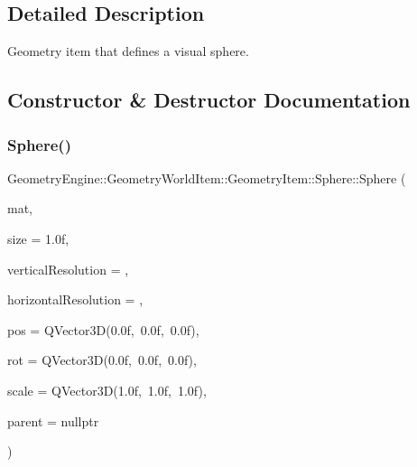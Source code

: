\subsection{Detailed Description}
Geometry item that defines a visual sphere. 

\subsection{Constructor \& Destructor Documentation}
\mbox{\label{class_geometry_engine_1_1_geometry_world_item_1_1_geometry_item_1_1_sphere_a347e98690182023f565422548d4a6b9f}} 
\subsubsection{\texorpdfstring{Sphere()}{Sphere()}\hspace{0.1cm}{\footnotesize\ttfamily [1/2]}}
{\footnotesize\ttfamily Geometry\+Engine\+::\+Geometry\+World\+Item\+::\+Geometry\+Item\+::\+Sphere\+::\+Sphere (\begin{DoxyParamCaption}\item[{const \mbox{\hyperlink{class_geometry_engine_1_1_geometry_material_1_1_material}{Geometry\+Material\+::\+Material}} \&}]{mat,  }\item[{float}]{size = {\ttfamily 1.0f},  }\item[{int}]{vertical\+Resolution = {},  }\item[{int}]{horizontal\+Resolution = {},  }\item[{const Q\+Vector3D \&}]{pos = {\ttfamily QVector3D(0.0f,~0.0f,~0.0f)},  }\item[{const Q\+Vector3D \&}]{rot = {\ttfamily QVector3D(0.0f,~0.0f,~0.0f)},  }\item[{const Q\+Vector3D \&}]{scale = {\ttfamily QVector3D(1.0f,~1.0f,~1.0f)},  }\item[{\mbox{\hyperlink{class_geometry_engine_1_1_geometry_world_item_1_1_world_item}{World\+Item}} $\ast$}]{parent = {\ttfamily nullptr} }\end{DoxyParamCaption})}

